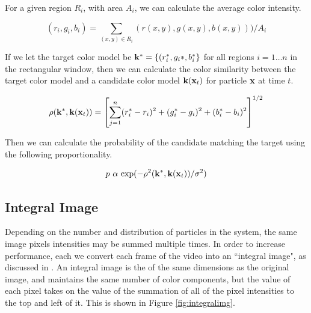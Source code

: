 \documentclass[11pt]{article}
\begin{document}
For a given region $R_i$, with area $A_i$, we can calculate the average color intensity.

\begin{equation}
(r_i,g_i,b_i) = \sum_{(x,y) \in R_i} (r(x,y), g(x,y), b(x,y))) / A_i
\label{eq:colorregionsum}
\end{equation}

If we let the target color model be ${\bf k}^* = \{ (r_i^*, g_i*, b_i^* \}$ for all regions $i = 1 \dots n$ in the rectangular window, then we can calculate the color similarity between the target color model and a candidate color model ${\bf k}({\bf x}_t)$ for particle ${\bf x}$ at time $t$.

\begin{equation}
\rho({\bf k}^*, {\bf k}({\bf x}_t)) = \left [ \sum^n_{j = 1} (r_i^* - r_i)^2 + (g_i^* - g_i)^2 + (b_i^* - b_i)^2 \right ] ^{1/2}
\label{eq:colorsimilarity}
\end{equation}

Then we can calculate the probability of the candidate matching the target using the following proportionality.

\begin{equation}
p \text{ $\alpha$ exp} (-\rho^2({\bf k}^*, {\bf k}({\bf x}_t)) / \sigma^2)
\label{eq:colorprob}
\end{equation}


\subsection{Integral Image}

Depending on the number and distribution of particles in the system, the same image pixels intensities may be summed multiple times. In order to increase performance, each we convert each frame of the video into an ``integral image", as discussed in \cite{facedetection}. An integral image is the of the same dimensions as the original image, and maintains the same number of color components, but the value of each pixel takes on the value of the summation of all of the pixel intensities to the top and left of it. This is shown in Figure \ref{fig:integralimg}.
 
\end{document}
